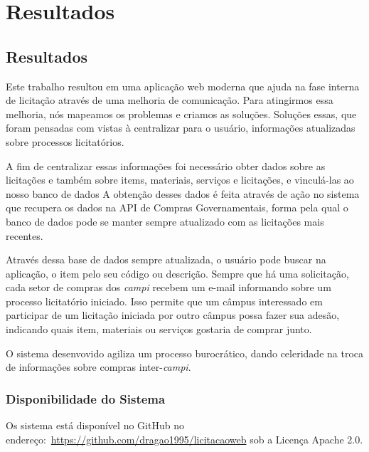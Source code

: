 \part{Resultados}

\chapter[Resultados]{Resultados}\label{Capitulo5}

Este trabalho resultou em uma aplicação web moderna que ajuda na fase interna de licitação através de uma melhoria de comunicação.
Para atingirmos essa melhoria, nós mapeamos os problemas e criamos as soluções.
Soluções essas, que foram pensadas com vistas à centralizar para o usuário, informações atualizadas sobre processos licitatórios.

A fim de centralizar essas informações foi necessário obter dados sobre as licitações e também sobre items, materiais, serviços e licitações, e vinculá-las ao nosso banco de dados
A obtenção desses dados é feita através de ação no sistema que recupera os dados na API de Compras Governamentais, forma pela qual o banco de dados pode se manter sempre atualizado com as licitações mais recentes.

Através dessa base de dados sempre atualizada, o usuário pode buscar na aplicação, o item pelo seu código ou descrição.
Sempre que há uma solicitação, cada setor de compras dos \textit{campi} recebem um e-mail informando sobre um processo licitatório iniciado.
Isso permite que um câmpus interessado em participar de um licitação iniciada por outro câmpus possa fazer sua adesão, indicando quais item, materiais ou serviços gostaria de comprar junto.

O sistema desenvovido agiliza um processo burocrático, dando celeridade na troca de informações sobre compras inter-\textit{campi}.


\section{Disponibilidade do Sistema}

Os sistema está disponível no GitHub no endereço:~\url{https://github.com/dragao1995/licitacaoweb} sob a Licença Apache 2.0.



